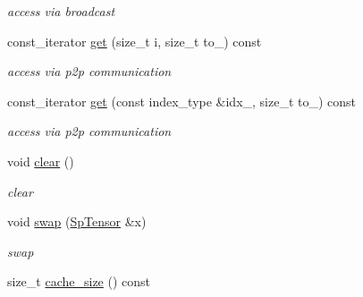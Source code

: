 \begin{DoxyCompactItemize}
\begin{DoxyCompactList}\small\item\em access via broadcast \item\end{DoxyCompactList}\item 
\hypertarget{classbtas_1_1_sp_tensor_a87b081ed5ef966b51132a15a603111c0}{
const\_\-iterator \hyperlink{classbtas_1_1_sp_tensor_a87b081ed5ef966b51132a15a603111c0}{get} (size\_\-t i, size\_\-t to\_\-) const }
\label{classbtas_1_1_sp_tensor_a87b081ed5ef966b51132a15a603111c0}

\begin{DoxyCompactList}\small\item\em access via p2p communication \item\end{DoxyCompactList}\item 
\hypertarget{classbtas_1_1_sp_tensor_a62cabb81af83fe3eaa231e5b540abba3}{
const\_\-iterator \hyperlink{classbtas_1_1_sp_tensor_a62cabb81af83fe3eaa231e5b540abba3}{get} (const index\_\-type \&idx\_\-, size\_\-t to\_\-) const }
\label{classbtas_1_1_sp_tensor_a62cabb81af83fe3eaa231e5b540abba3}

\begin{DoxyCompactList}\small\item\em access via p2p communication \item\end{DoxyCompactList}\item 
\hypertarget{classbtas_1_1_sp_tensor_a6785a6441a93d93e37a973706156952b}{
void \hyperlink{classbtas_1_1_sp_tensor_a6785a6441a93d93e37a973706156952b}{clear} ()}
\label{classbtas_1_1_sp_tensor_a6785a6441a93d93e37a973706156952b}

\begin{DoxyCompactList}\small\item\em clear \item\end{DoxyCompactList}\item 
\hypertarget{classbtas_1_1_sp_tensor_af2047c5b05af8d59a5e95348e9dad7db}{
void \hyperlink{classbtas_1_1_sp_tensor_af2047c5b05af8d59a5e95348e9dad7db}{swap} (\hyperlink{classbtas_1_1_sp_tensor}{SpTensor} \&x)}
\label{classbtas_1_1_sp_tensor_af2047c5b05af8d59a5e95348e9dad7db}

\begin{DoxyCompactList}\small\item\em swap \item\end{DoxyCompactList}\item 
\hypertarget{classbtas_1_1_sp_tensor_a7691728b3759bc2cad2af26c42869c68}{
size\_\-t \hyperlink{classbtas_1_1_sp_tensor_a7691728b3759bc2cad2af26c42869c68}{cache\_\-size} () const }
\label{classbtas_1_1_sp_tensor_a7691728b3759bc2cad2af26c42869c68}


\end{DoxyCompactItemize}
